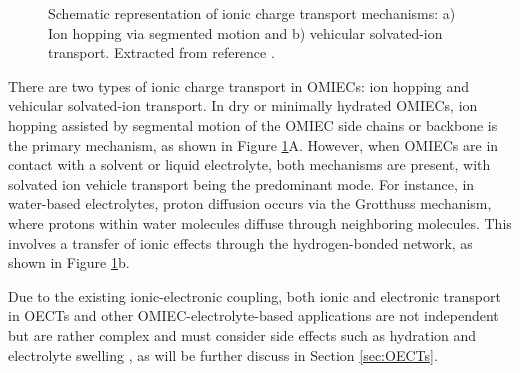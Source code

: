\begin{figure}[!htb]
	\centering
	\hspace{2em}
	\caption[Ionic transport mechanisms in OMIECs]{Schematic representation of ionic charge transport mechanisms: a) Ion hopping via segmented motion and b) vehicular solvated-ion transport. Extracted from reference \cite{paulsenOrganicMixedIonic2020}.}
	\label{fig:itrans}
\end{figure}

There are two types of ionic charge transport in OMIECs: ion hopping and vehicular solvated-ion transport. In dry or minimally hydrated OMIECs, ion hopping assisted by segmental motion of the OMIEC side chains or backbone is the primary mechanism, as shown in Figure \ref{fig:itrans}A. However, when OMIECs are in contact with a solvent or liquid electrolyte, both mechanisms are present, with solvated ion vehicle transport being the predominant mode. For instance, in water-based electrolytes, proton diffusion occurs via the Grotthuss mechanism, where protons within water molecules diffuse through neighboring molecules. This involves a transfer of ionic effects through the hydrogen-bonded network, as shown in Figure \ref{fig:itrans}b.

Due to the existing ionic-electronic coupling, both ionic and electronic transport in OECTs and other OMIEC-electrolyte-based applications are not independent but are rather complex and must consider side effects such as hydration and electrolyte swelling \cite{paulsenOrganicMixedIonic2020}, as will be further discuss in Section \ref{sec:OECTs}.

